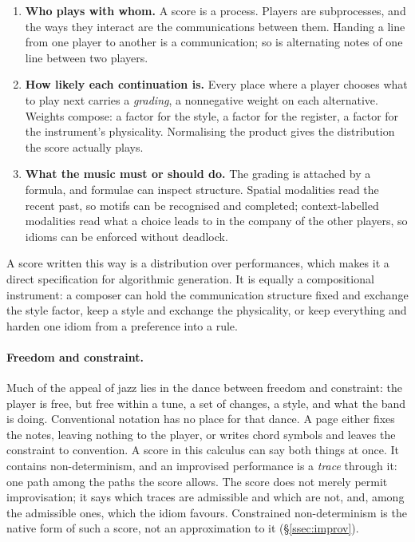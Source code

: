 \documentclass[11pt,a4paper]{article}
\theoremstyle{plain}
\theoremstyle{definition}
\theoremstyle{remark}
\begin{document}
\begin{enumerate}[leftmargin=*,itemsep=2pt]
\item \textbf{Who plays with whom.} A score is a process. Players are
  subprocesses, and the ways they interact are the communications between them.
  Handing a line from one player to another is a communication; so is
  alternating notes of one line between two players.
\item \textbf{How likely each continuation is.} Every place where a player
  chooses what to play next carries a \emph{grading}, a nonnegative weight on
  each alternative. Weights compose: a factor for the style, a factor for the
  register, a factor for the instrument's physicality. Normalising the product
  gives the distribution the score actually plays.
\item \textbf{What the music must or should do.} The grading is attached by a
  formula, and formulae can inspect structure. Spatial modalities read the
  recent past, so motifs can be recognised and completed; context-labelled
  modalities read what a choice leads to in the company of the other players,
  so idioms can be enforced without deadlock.
\end{enumerate}

\noindent A score written this way is a distribution over performances, which
makes it a direct specification for algorithmic generation. It is equally a
compositional instrument: a composer can hold the communication structure fixed
and exchange the style factor, keep a style and exchange the physicality, or
keep everything and harden one idiom from a preference into a rule.

\paragraph{Freedom and constraint.} Much of the appeal of jazz lies in the
dance between freedom and constraint: the player is free, but free within a
tune, a set of changes, a style, and what the band is doing. Conventional
notation has no place for that dance. A page either fixes the notes, leaving
nothing to the player, or writes chord symbols and leaves the constraint to
convention. A score in this calculus can say both things at once. It contains
non-determinism, and an improvised performance is a \emph{trace} through it:
one path among the paths the score allows. The score does not merely permit
improvisation; it says which traces are admissible and which are not, and, among
the admissible ones, which the idiom favours. Constrained non-determinism is the
native form of such a score, not an approximation to it
(\S\ref{ssec:improv}).
\end{document}
